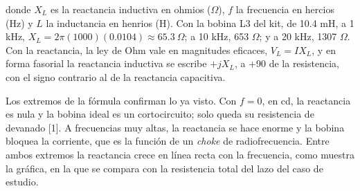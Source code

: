\documentclass[11pt,letterpaper]{article}
\begin{document}
donde $X_L$ es la reactancia inductiva en ohmios (\ensuremath{\Omega}), $f$ la frecuencia en hercios (Hz) y $L$ la inductancia en henrios (H). Con la bobina L3 del kit, de 10.4 mH, a 1 kHz, $X_L = 2\pi(1000)(0.0104) \approx 65.3\ \Omega$; a 10 kHz, 653 \ensuremath{\Omega}; y a 20 kHz, 1307 \ensuremath{\Omega}. Con la reactancia, la ley de Ohm vale en magnitudes eficaces, $V_L = I X_L$, y en forma fasorial la reactancia inductiva se escribe $+jX_L$, a +90\textdegree{} de la resistencia, con el signo contrario al de la reactancia capacitiva.

Los extremos de la fórmula confirman lo ya visto. Con $f = 0$, en cd, la reactancia es nula y la bobina ideal es un cortocircuito; solo queda su resistencia de devanado [1]. A frecuencias muy altas, la reactancia se hace enorme y la bobina bloquea la corriente, que es la función de un \textit{choke} de radiofrecuencia. Entre ambos extremos la reactancia crece en línea recta con la frecuencia, como muestra la gráfica, en la que se compara con la resistencia total del lazo del caso de estudio.
\end{document}
